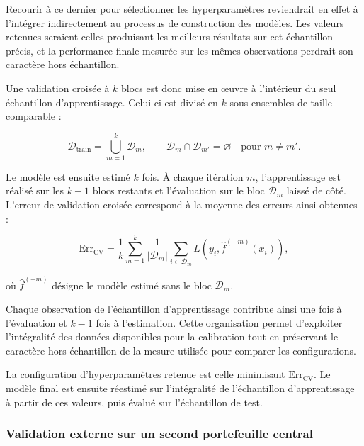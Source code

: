 Recourir à ce dernier pour sélectionner les hyperparamètres reviendrait en effet à l'intégrer indirectement au processus de construction des modèles. Les valeurs retenues seraient celles produisant les meilleurs résultats sur cet échantillon précis, et la performance finale mesurée sur les mêmes observations perdrait son caractère hors échantillon.

Une validation croisée à $k$ blocs est donc mise en œuvre à l'intérieur du seul échantillon d'apprentissage. Celui-ci est divisé en $k$ sous-ensembles de taille comparable :

\begin{equation}
\mathcal{D}_{\text{train}} = \bigcup_{m=1}^{k} \mathcal{D}_m, 
\qquad 
\mathcal{D}_m \cap \mathcal{D}_{m'} = \varnothing 
\quad \text{pour } m \neq m'.
\label{eq:blocs-validation-croisee}
\end{equation}

Le modèle est ensuite estimé $k$ fois. À chaque itération $m$, l'apprentissage est réalisé sur les $k-1$ blocs restants et l'évaluation sur le bloc $\mathcal{D}_m$ laissé de côté. L'erreur de validation croisée correspond à la moyenne des erreurs ainsi obtenues :

\begin{equation}
\text{Err}_{\text{CV}} = \frac{1}{k} \sum_{m=1}^{k} 
\frac{1}{|\mathcal{D}_m|} \sum_{i \in \mathcal{D}_m} 
L\left(y_i, \hat{f}^{(-m)}(x_i)\right),
\label{eq:erreur-validation-croisee}
\end{equation}

où $\hat{f}^{(-m)}$ désigne le modèle estimé sans le bloc $\mathcal{D}_m$.

Chaque observation de l'échantillon d'apprentissage contribue ainsi une fois à l'évaluation et $k-1$ fois à l'estimation. Cette organisation permet d'exploiter l'intégralité des données disponibles pour la calibration tout en préservant le caractère hors échantillon de la mesure utilisée pour comparer les configurations.

La configuration d'hyperparamètres retenue est celle minimisant $\text{Err}_{\text{CV}}$. Le modèle final est ensuite réestimé sur l'intégralité de l'échantillon d'apprentissage à partir de ces valeurs, puis évalué sur l'échantillon de test.

\subsubsection{Validation externe sur un second portefeuille central}

